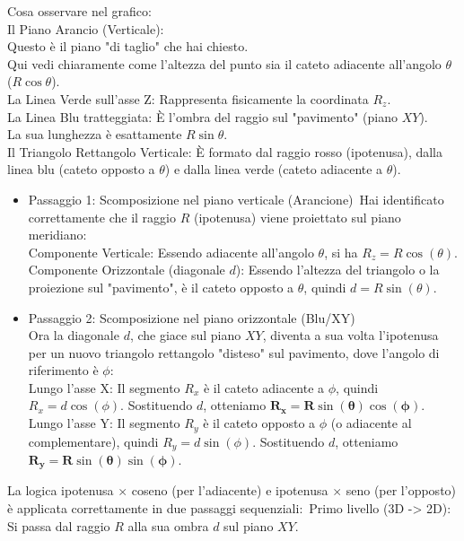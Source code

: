 \documentclass[a4paper,14pt]{article}
\begin{document}
\clearpage
Cosa osservare nel grafico:\\
Il Piano Arancio (Verticale):\\
Questo è il piano "di taglio" che hai chiesto.\\
Qui vedi chiaramente come l'altezza del punto sia il cateto adiacente all'angolo \(\theta \) (\(R\cos \theta \)).\\
La Linea Verde sull'asse Z: Rappresenta fisicamente la coordinata \(R_{z}\).\\
La Linea Blu tratteggiata: È l'ombra del raggio sul "pavimento" (piano \(XY\)).\\
La sua lunghezza è esattamente \(R\sin \theta \).\\
Il Triangolo Rettangolo Verticale: È formato dal raggio rosso (ipotenusa), dalla linea blu (cateto opposto a \(\theta \)) e dalla linea verde (cateto adiacente a \(\theta \)).
\begin{itemize}
\item Passaggio 1: Scomposizione nel piano verticale (Arancione) Hai identificato correttamente che il raggio \(R\) (ipotenusa) viene proiettato sul piano meridiano:\\
Componente Verticale: Essendo adiacente all'angolo \(\theta \), si ha \(R_{z}=R\cos (\theta )\).\\
Componente Orizzontale (diagonale \(d\)): Essendo l'altezza del triangolo o la proiezione sul "pavimento", è il cateto opposto a \(\theta \), quindi \(d=R\sin (\theta )\).
\item Passaggio 2: Scomposizione nel piano orizzontale (Blu/XY)\\
Ora la diagonale \(d\), che giace sul piano \(XY\), diventa a sua volta l'ipotenusa per un nuovo triangolo rettangolo "disteso" sul pavimento, dove l'angolo di riferimento è \(\phi \):\\
Lungo l'asse X: Il segmento \(R_{x}\) è il cateto adiacente a \(\phi \), quindi \(R_{x}=d\cos (\phi )\). Sostituendo \(d\), otteniamo \(\mathbf{R}_{\mathbf{x}}\mathbf{=R}\sin \mathbf{(\theta )}\cos \mathbf{(\phi )}\).\\
Lungo l'asse Y: Il segmento \(R_{y}\) è il cateto opposto a \(\phi \) (o adiacente al complementare), quindi \(R_{y}=d\sin (\phi )\). Sostituendo \(d\), otteniamo \(\mathbf{R}_{\mathbf{y}}\mathbf{=R}\sin \mathbf{(\theta )}\sin \mathbf{(\phi )}\).
\end{itemize}
La logica ipotenusa \(\times \) coseno (per l'adiacente) e ipotenusa \(\times \) seno (per l'opposto) è applicata correttamente in due passaggi sequenziali: Primo livello (3D -> 2D): Si passa dal raggio \(R\) alla sua ombra \(d\) sul piano \(XY\).\\
\end{document}
